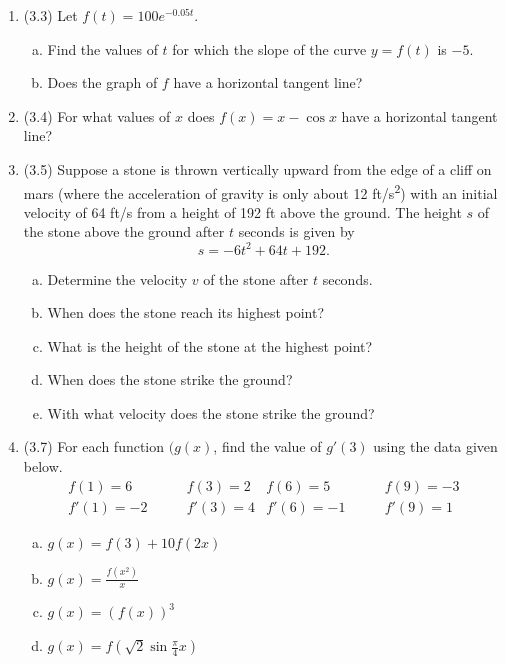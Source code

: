 \documentclass[11pt,letterpaper]{article}
\begin{document}
\begin{enumerate}[I.]
\begin{enumerate}[1.]
	\item (3.3) Let $f(t)=100e^{-0.05t}$.
		\begin{enumerate}[(a)]
		\item Find the values of $t$ for which the slope of the curve $y=f(t)$ is $-5$.
		\item Does the graph of $f$ have a horizontal tangent line?
		\end{enumerate}
	
	\item (3.4) For what values of $x$ does $f(x)=x-\cos x$ have a horizontal tangent line?
		
	\item (3.5) Suppose a stone is thrown vertically upward from the edge of a cliff on mars (where the acceleration of gravity is only about 12 ft/s\textsuperscript{2}) with an initial velocity of 64 ft/s from a height of 192 ft above the ground.  The height $s$ of the stone above the ground after $t$ seconds is given by 
	\[s=-6t^2+64t+192.\]
		\begin{enumerate}[(a)]
		\item Determine the velocity $v$ of the stone after $t$ seconds.
		\item When does the stone reach its highest  point?
		\item What is the height of the stone at the highest point?
		\item When does the stone strike the ground?
		\item With what velocity does the stone strike the ground?
		\end{enumerate}
	
	\item (3.7) For each function $(g(x)$, find the value of $g'(3)$ using the data given below.
	\begin{align*}
	f(1)=6 & \qquad f(3)=2 & f(6)=5 & \qquad f(9)=-3\\
	f'(1)=-2 & \qquad f'(3)=4 & f'(6)=-1 & \qquad f'(9)=1
	\end{align*}
		\begin{enumerate}[(a)]
		\item $g(x)=f(3)+10f(2x)$
		\item $g(x)=\displaystyle\frac{f(x^2)}{x}$
		\item $g(x)=\left(f(x)\right)^3$
		\item $g(x)=f(\sqrt{2}\sin{\frac{\pi}{4}x})$                                        
		\end{enumerate}
		

\end{enumerate}
\end{enumerate}
\end{document}
